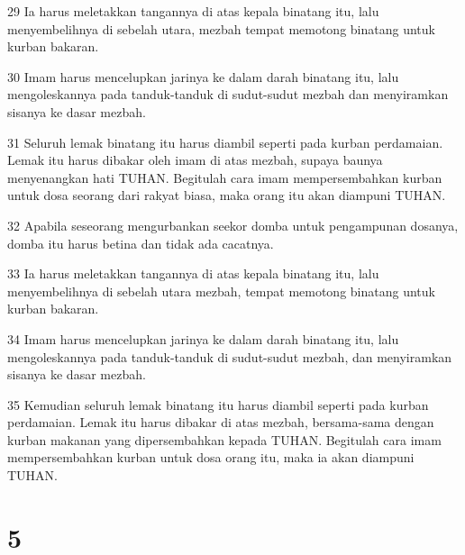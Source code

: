 \par 29 Ia harus meletakkan tangannya di atas kepala binatang itu, lalu menyembelihnya di sebelah utara, mezbah tempat memotong binatang untuk kurban bakaran.
\par 30 Imam harus mencelupkan jarinya ke dalam darah binatang itu, lalu mengoleskannya pada tanduk-tanduk di sudut-sudut mezbah dan menyiramkan sisanya ke dasar mezbah.
\par 31 Seluruh lemak binatang itu harus diambil seperti pada kurban perdamaian. Lemak itu harus dibakar oleh imam di atas mezbah, supaya baunya menyenangkan hati TUHAN. Begitulah cara imam mempersembahkan kurban untuk dosa seorang dari rakyat biasa, maka orang itu akan diampuni TUHAN.
\par 32 Apabila seseorang mengurbankan seekor domba untuk pengampunan dosanya, domba itu harus betina dan tidak ada cacatnya.
\par 33 Ia harus meletakkan tangannya di atas kepala binatang itu, lalu menyembelihnya di sebelah utara mezbah, tempat memotong binatang untuk kurban bakaran.
\par 34 Imam harus mencelupkan jarinya ke dalam darah binatang itu, lalu mengoleskannya pada tanduk-tanduk di sudut-sudut mezbah, dan menyiramkan sisanya ke dasar mezbah.
\par 35 Kemudian seluruh lemak binatang itu harus diambil seperti pada kurban perdamaian. Lemak itu harus dibakar di atas mezbah, bersama-sama dengan kurban makanan yang dipersembahkan kepada TUHAN. Begitulah cara imam mempersembahkan kurban untuk dosa orang itu, maka ia akan diampuni TUHAN.

\chapter{5}

